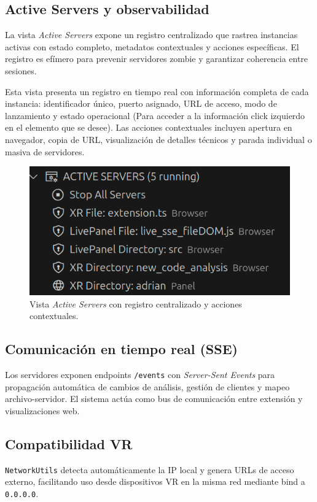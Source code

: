 \documentclass[a4paper, 12pt]{book}
\begin{document}
\subsection{Active Servers y observabilidad}
La vista \emph{Active Servers} expone un registro centralizado que rastrea instancias activas con estado completo, metadatos contextuales y acciones específicas. El registro es efímero para prevenir servidores zombie y garantizar coherencia entre sesiones.

Esta vista presenta un registro en tiempo real con información completa de cada instancia: identificador único, puerto asignado, URL de acceso, modo de lanzamiento y estado operacional (Para acceder a la información click izquierdo en el elemento que se desee). Las acciones contextuales incluyen apertura en navegador, copia de URL, visualización de detalles técnicos y parada individual o masiva de servidores.

\begin{figure}[H]
\centering
\includegraphics[width=0.65\linewidth]{img/ui-active-servers.png}
\caption{Vista \emph{Active Servers} con registro centralizado y acciones contextuales.}
\label{fig:ui-active-servers}
\end{figure}

\subsection{Comunicación en tiempo real (SSE)}
Los servidores exponen endpoints \texttt{/events} con \emph{Server-Sent Events} para propagación automática de cambios de análisis, gestión de clientes y mapeo archivo-servidor. El sistema actúa como bus de comunicación entre extensión y visualizaciones web.

\subsection{Compatibilidad VR}
\texttt{NetworkUtils} detecta automáticamente la IP local y genera URLs de acceso externo, facilitando uso desde dispositivos VR en la misma red mediante bind a \texttt{0.0.0.0}.
\end{document}
